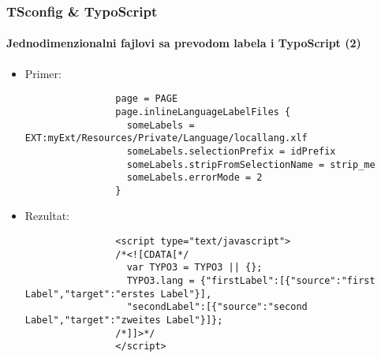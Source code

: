 \begin{frame}[fragile]
	\frametitle{TSconfig \& TypoScript}
	\framesubtitle{Jednodimenzionalni fajlovi sa prevodom labela i TypoScript (2)}

	\lstset{basicstyle=\tiny\ttfamily}

	\begin{itemize}

		\item Primer:

			\begin{lstlisting}
				page = PAGE
				page.inlineLanguageLabelFiles {
				  someLabels = EXT:myExt/Resources/Private/Language/locallang.xlf
				  someLabels.selectionPrefix = idPrefix
				  someLabels.stripFromSelectionName = strip_me
				  someLabels.errorMode = 2
				}
			\end{lstlisting}

		\item Rezultat:

			\begin{lstlisting}
				<script type="text/javascript">
				/*<![CDATA[*/
				  var TYPO3 = TYPO3 || {};
				  TYPO3.lang = {"firstLabel":[{"source":"first Label","target":"erstes Label"}],
				  "secondLabel":[{"source":"second Label","target":"zweites Label"}]};
				/*]]>*/
				</script>
			\end{lstlisting}

	\end{itemize}

\end{frame}

